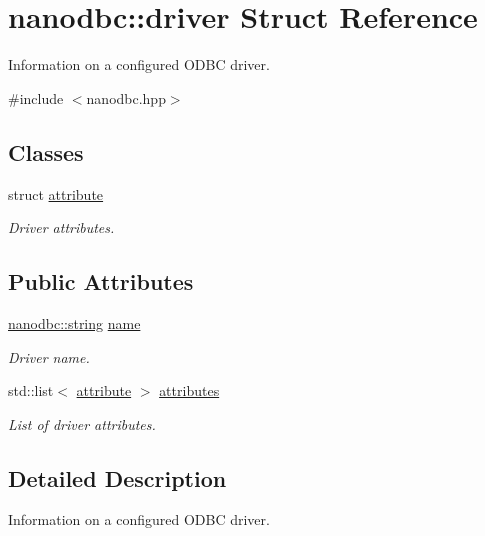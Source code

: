 \hypertarget{structnanodbc_1_1driver}{}\section{nanodbc\+::driver Struct Reference}
\label{structnanodbc_1_1driver}


Information on a configured O\+D\+BC driver.  




{\ttfamily \#include $<$nanodbc.\+hpp$>$}

\subsection*{Classes}
\begin{DoxyCompactItemize}
\item 
struct \mbox{\hyperlink{structnanodbc_1_1driver_1_1attribute}{attribute}}
\begin{DoxyCompactList}\small\item\em Driver attributes. \end{DoxyCompactList}\end{DoxyCompactItemize}
\subsection*{Public Attributes}
\begin{DoxyCompactItemize}
\item 
\mbox{\hyperlink{namespacenanodbc_abfc0ece56278e590911ec8352774c212}{nanodbc\+::string}} \mbox{\hyperlink{structnanodbc_1_1driver_a199181975093cc309564d0de3b296c71}{name}}
\begin{DoxyCompactList}\small\item\em Driver name. \end{DoxyCompactList}\item 
std\+::list$<$ \mbox{\hyperlink{structnanodbc_1_1driver_1_1attribute}{attribute}} $>$ \mbox{\hyperlink{structnanodbc_1_1driver_a4528ae3553031578ba886933c03c3f35}{attributes}}
\begin{DoxyCompactList}\small\item\em List of driver attributes. \end{DoxyCompactList}\end{DoxyCompactItemize}


\subsection{Detailed Description}
Information on a configured O\+D\+BC driver. 

